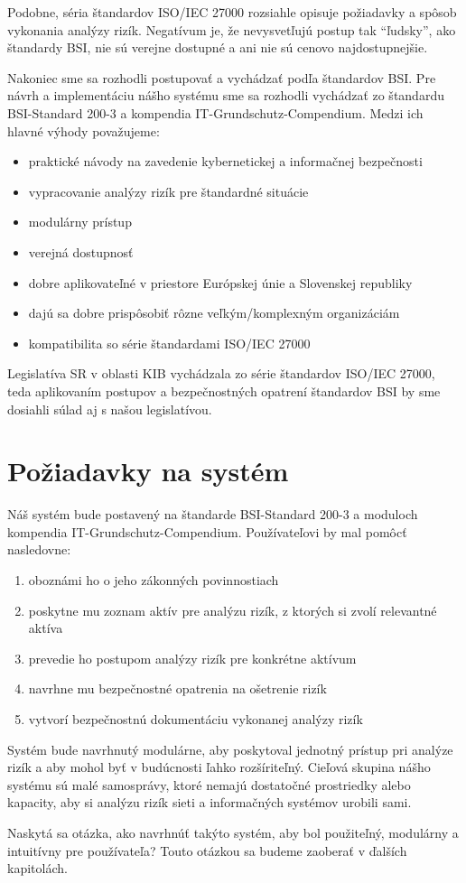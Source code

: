 Podobne, séria štandardov ISO/IEC 27000 rozsiahle opisuje požiadavky a spôsob vykonania analýzy rizík. Negatívum je, že nevysvetľujú postup tak \enquote{ľudsky},
ako štandardy BSI, nie sú verejne dostupné a ani nie sú cenovo najdostupnejšie.

Nakoniec sme sa rozhodli postupovať a vychádzať podľa štandardov BSI. Pre návrh a implementáciu nášho systému sme sa rozhodli vychádzať zo štandardu
BSI-Standard 200-3\cite{bsi_200_3} a kompendia IT-Grundschutz-Compendium\cite{bsi_it_grundchutz_compendium}. Medzi ich hlavné výhody považujeme:
\begin{itemize}
    \item praktické návody na zavedenie kybernetickej a informačnej bezpečnosti
    \item vypracovanie analýzy rizík pre štandardné situácie
    \item modulárny prístup
    \item verejná dostupnosť
    \item dobre aplikovateľné v priestore Európskej únie a Slovenskej republiky
    \item dajú sa dobre prispôsobiť rôzne veľkým/komplexným organizáciám
    \item kompatibilita so série štandardami ISO/IEC 27000
\end{itemize}

Legislatíva SR v oblasti KIB vychádzala zo série štandardov ISO/IEC 27000, teda aplikovaním postupov a bezpečnostných opatrení štandardov BSI by sme dosiahli
súlad aj s našou legislatívou.


\section{Požiadavky na systém}

Náš systém bude postavený na štandarde BSI-Standard 200-3\cite{bsi_200_3} a moduloch kompendia IT-Grundschutz-Compendium\cite{bsi_it_grundchutz_compendium}.
Používateľovi by mal pomôcť nasledovne:
\begin{enumerate}
    \item oboznámi ho o jeho zákonných povinnostiach
    \item poskytne mu zoznam aktív pre analýzu rizík, z ktorých si zvolí relevantné aktíva
    \item prevedie ho postupom analýzy rizík pre konkrétne aktívum
    \item navrhne mu bezpečnostné opatrenia na ošetrenie rizík
    \item vytvorí bezpečnostnú dokumentáciu vykonanej analýzy rizík
\end{enumerate}

Systém bude navrhnutý modulárne, aby poskytoval jednotný prístup pri analýze rizík a aby mohol byť v budúcnosti ľahko rozšíriteľný.
Cieľová skupina nášho systému sú malé samosprávy, ktoré nemajú dostatočné prostriedky alebo kapacity, aby si analýzu rizík sieti a informačných systémov
urobili sami.

Naskytá sa otázka, ako navrhnúť takýto systém, aby bol použiteľný, modulárny a intuitívny pre používateľa? Touto otázkou sa budeme zaoberať v ďalších kapitolách.